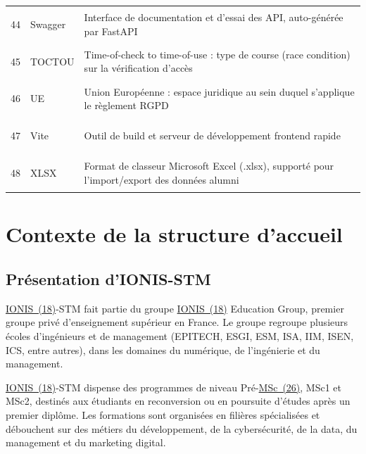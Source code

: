 \documentclass[12pt,a4paper]{report}
\begin{document}
\begin{longtable}{@{} l l >{\RaggedRight\arraybackslash}p{12.0cm} @{}}
\hypertarget{abbr-Swagger}{44} & Swagger & Interface de documentation et d'essai des API, auto-générée par FastAPI \\
\hypertarget{abbr-TOCTOU}{45} & TOCTOU & Time-of-check to time-of-use : type de course (race condition) sur la vérification d'accès \\
\hypertarget{abbr-UE}{46} & UE & Union Européenne : espace juridique au sein duquel s'applique le règlement RGPD \\
\hypertarget{abbr-Vite}{47} & Vite & Outil de build et serveur de développement frontend rapide \\
\hypertarget{abbr-XLSX}{48} & XLSX & Format de classeur Microsoft Excel (.xlsx), supporté pour l'import/export des données alumni \\
\end{longtable}

\newpage
\listoffigures
{}
\newpage
\listoftables
{}

\chapter{Contexte de la structure d'accueil}

\section{Présentation d'IONIS-STM}

\hyperlink{abbr-IONIS}{IONIS~(18)}-STM fait partie du groupe \hyperlink{abbr-IONIS}{IONIS~(18)} Education Group, premier groupe privé d'enseignement supérieur en France. Le groupe regroupe plusieurs écoles d'ingénieurs et de management (EPITECH, ESGI, ESM, ISA, IIM, ISEN, ICS, entre autres), dans les domaines du numérique, de l'ingénierie et du management.

\hyperlink{abbr-IONIS}{IONIS~(18)}-STM dispense des programmes de niveau Pré-\hyperlink{abbr-MSc}{MSc~(26)}, MSc1 et MSc2, destinés aux étudiants en reconversion ou en poursuite d'études après un premier diplôme. Les formations sont organisées en filières spécialisées et débouchent sur des métiers du développement, de la cybersécurité, de la data, du management et du marketing digital.
\end{document}
